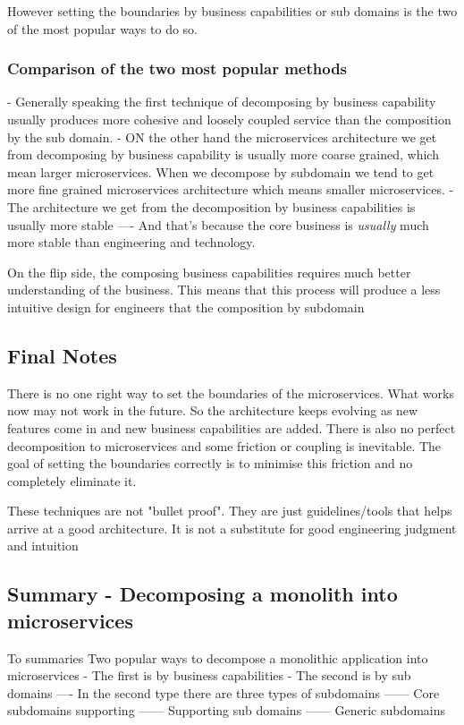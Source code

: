 \documentclass[a4paper, 11pt]{book}
\begin{document}
    However setting the boundaries by business capabilities or sub domains is the two of the most popular ways to do so.

    \subsubsection{Comparison of the two most popular methods}
    - Generally speaking the first technique of decomposing by business capability usually produces more cohesive and loosely coupled service than the composition by the sub domain.
    - ON the other hand the microservices architecture we get from decomposing by business capability is usually more coarse grained, which mean larger microservices.
    When we decompose by subdomain we tend to get more fine grained microservices architecture which means smaller microservices.
    - The architecture we get from the decomposition by business capabilities is usually more stable
    ---- And that's because the core business is \textit{usually} much more stable than engineering and technology.

    On the flip side, the composing business capabilities requires much better understanding of the business.
    This means that this process will produce a less intuitive design for engineers that the composition by subdomain

    \subsection{Final Notes}
    There is no one right way to set the boundaries of the microservices.
    What works now may not work in the future.
    So the architecture keeps evolving as new features come in and new business capabilities are added.
    There is also no perfect decomposition to microservices and some friction or coupling is inevitable.
    The goal of setting the boundaries correctly is to minimise this friction and no completely eliminate it.

    These techniques are not "bullet proof".
    They are just guidelines/tools that helps arrive at a good architecture.
    It is not a substitute for good engineering judgment and intuition

    \subsection{Summary - Decomposing a monolith into microservices}
    To summaries
    Two popular ways to decompose a monolithic application into microservices
    - The first is by business capabilities
    - The second is by sub domains
    ---- In the second type there are three types of subdomains
    ------ Core subdomains supporting
    ------ Supporting sub domains
    ------ Generic subdomains
\end{document}
